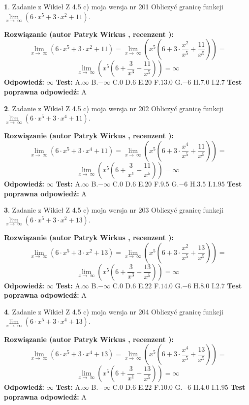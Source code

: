 \documentclass[12pt, a4paper]{article}
\theoremstyle{definition} %
\newtheorem{zad}{}
\newcommand{\zadStart}[1]{\begin{zad}#1\newline}
\newcommand{\zadStop}{\end{zad}}
\newcommand{\rozwStart}[2]{\noindent \textbf{Rozwiązanie (autor #1 , recenzent #2): }\newline}
\newcommand{\rozwStop}{\newline}
\newcommand{\odpStart}{\noindent \textbf{Odpowiedź:}\newline}
\newcommand{\odpStop}{\newline}
\newcommand{\testStart}{\noindent \textbf{Test:}\newline}
\newcommand{\testStop}{\newline}
\newcommand{\kluczStart}{\noindent \textbf{Test poprawna odpowiedź:}\newline}
\newcommand{\kluczStop}{\newline}
\begin{document}
\zadStart{Zadanie z Wikieł Z 4.5 c) moja wersja nr 201}
Obliczyć granicę funkcji  $\lim\limits_{x\to\ \infty}(6 \cdot x^{5}+3 \cdot x^{2}+11)$.
\zadStop
\rozwStart{Patryk Wirkus}{}
$$\lim\limits_{x\to\ \infty}(6 \cdot x^{5}+3 \cdot x^{2}+11) = \lim\limits_{x\to\ \infty}(x^{5}(6 +3 \cdot \frac{x^{2}}{x^{5}}+\frac{11}{x^{5}})) =$$ $$\lim\limits_{x\to\ \infty}(x^{5}(6 +\frac{3}{x^{3}}+\frac{11}{x^{5}})) =\infty$$
\rozwStop
\odpStart
$\infty$
\odpStop
\testStart
A.$\infty$ B.$-\infty$ C.$0$ D.$6$ E.$20$
F.$13.0$ G.$-6$
H.$7.0$
I.$2.7$
\testStop
\kluczStart
A
\kluczStop



\zadStart{Zadanie z Wikieł Z 4.5 c) moja wersja nr 202}
Obliczyć granicę funkcji  $\lim\limits_{x\to\ \infty}(6 \cdot x^{5}+3 \cdot x^{4}+11)$.
\zadStop
\rozwStart{Patryk Wirkus}{}
$$\lim\limits_{x\to\ \infty}(6 \cdot x^{5}+3 \cdot x^{4}+11) = \lim\limits_{x\to\ \infty}(x^{5}(6 +3 \cdot \frac{x^{4}}{x^{5}}+\frac{11}{x^{5}})) =$$ $$\lim\limits_{x\to\ \infty}(x^{5}(6 +\frac{3}{x^{1}}+\frac{11}{x^{5}})) =\infty$$
\rozwStop
\odpStart
$\infty$
\odpStop
\testStart
A.$\infty$ B.$-\infty$ C.$0$ D.$6$ E.$20$
F.$9.5$ G.$-6$
H.$3.5$
I.$1.95$
\testStop
\kluczStart
A
\kluczStop



\zadStart{Zadanie z Wikieł Z 4.5 c) moja wersja nr 203}
Obliczyć granicę funkcji  $\lim\limits_{x\to\ \infty}(6 \cdot x^{5}+3 \cdot x^{2}+13)$.
\zadStop
\rozwStart{Patryk Wirkus}{}
$$\lim\limits_{x\to\ \infty}(6 \cdot x^{5}+3 \cdot x^{2}+13) = \lim\limits_{x\to\ \infty}(x^{5}(6 +3 \cdot \frac{x^{2}}{x^{5}}+\frac{13}{x^{5}})) =$$ $$\lim\limits_{x\to\ \infty}(x^{5}(6 +\frac{3}{x^{3}}+\frac{13}{x^{5}})) =\infty$$
\rozwStop
\odpStart
$\infty$
\odpStop
\testStart
A.$\infty$ B.$-\infty$ C.$0$ D.$6$ E.$22$
F.$14.0$ G.$-6$
H.$8.0$
I.$2.7$
\testStop
\kluczStart
A
\kluczStop



\zadStart{Zadanie z Wikieł Z 4.5 c) moja wersja nr 204}
Obliczyć granicę funkcji  $\lim\limits_{x\to\ \infty}(6 \cdot x^{5}+3 \cdot x^{4}+13)$.
\zadStop
\rozwStart{Patryk Wirkus}{}
$$\lim\limits_{x\to\ \infty}(6 \cdot x^{5}+3 \cdot x^{4}+13) = \lim\limits_{x\to\ \infty}(x^{5}(6 +3 \cdot \frac{x^{4}}{x^{5}}+\frac{13}{x^{5}})) =$$ $$\lim\limits_{x\to\ \infty}(x^{5}(6 +\frac{3}{x^{1}}+\frac{13}{x^{5}})) =\infty$$
\rozwStop
\odpStart
$\infty$
\odpStop
\testStart
A.$\infty$ B.$-\infty$ C.$0$ D.$6$ E.$22$
F.$10.0$ G.$-6$
H.$4.0$
I.$1.95$
\testStop
\kluczStart
A
\kluczStop
\end{document}
